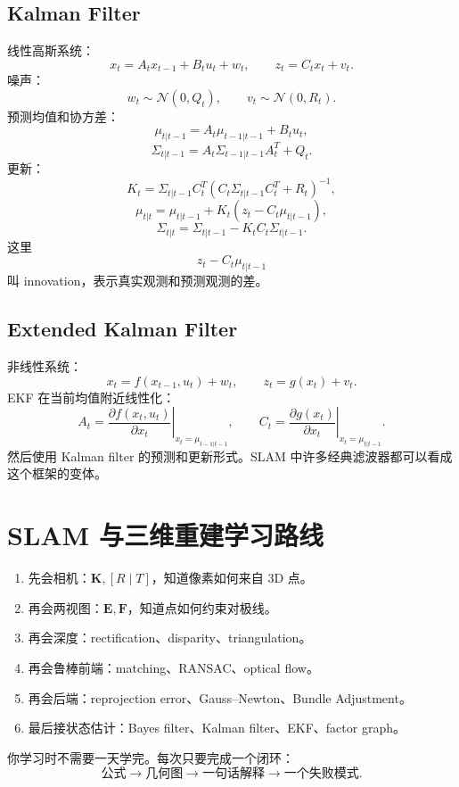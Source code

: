 \documentclass[11pt]{article}
\newcommand{\K}{\mathbf{K}}
\newcommand{\E}{\mathbf{E}}
\newcommand{\F}{\mathbf{F}}
\newcommand{\Normal}{\mathcal{N}}
\begin{document}
\subsection{Kalman Filter}

线性高斯系统：
\[
  x_t=A_tx_{t-1}+B_tu_t+w_t,\qquad
  z_t=C_tx_t+v_t.
\]
噪声：
\[
  w_t\sim\Normal(0,Q_t),\qquad v_t\sim\Normal(0,R_t).
\]
预测均值和协方差：
\[
  \mu_{t|t-1}=A_t\mu_{t-1|t-1}+B_tu_t,
\]
\[
  \Sigma_{t|t-1}=A_t\Sigma_{t-1|t-1}A_t^T+Q_t.
\]
更新：
\[
  K_t=
  \Sigma_{t|t-1}C_t^T
  (C_t\Sigma_{t|t-1}C_t^T+R_t)^{-1},
\]
\[
  \mu_{t|t}=\mu_{t|t-1}+K_t(z_t-C_t\mu_{t|t-1}),
\]
\[
  \Sigma_{t|t}=\Sigma_{t|t-1}-K_tC_t\Sigma_{t|t-1}.
\]
这里
\[
  z_t-C_t\mu_{t|t-1}
\]
叫 innovation，表示真实观测和预测观测的差。

\subsection{Extended Kalman Filter}

非线性系统：
\[
  x_t=f(x_{t-1},u_t)+w_t,\qquad
  z_t=g(x_t)+v_t.
\]
EKF 在当前均值附近线性化：
\[
  A_t=
  \left.
  \frac{\partial f(x_t,u_t)}{\partial x_t}
  \right|_{x_t=\mu_{t-1|t-1}},
\qquad
  C_t=
  \left.
  \frac{\partial g(x_t)}{\partial x_t}
  \right|_{x_t=\mu_{t|t-1}}.
\]
然后使用 Kalman filter 的预测和更新形式。SLAM 中许多经典滤波器都可以看成这个框架的变体。

\section{SLAM 与三维重建学习路线}

\begin{enumerate}
  \item 先会相机：$\K,[R\mid T]$，知道像素如何来自 3D 点。
  \item 再会两视图：$\E,\F$，知道点如何约束对极线。
  \item 再会深度：rectification、disparity、triangulation。
  \item 再会鲁棒前端：matching、RANSAC、optical flow。
  \item 再会后端：reprojection error、Gauss--Newton、Bundle Adjustment。
  \item 最后接状态估计：Bayes filter、Kalman filter、EKF、factor graph。
\end{enumerate}

你学习时不需要一天学完。每次只要完成一个闭环：
\[
  \text{公式} \rightarrow \text{几何图} \rightarrow \text{一句话解释} \rightarrow \text{一个失败模式}.
\]
\end{document}
